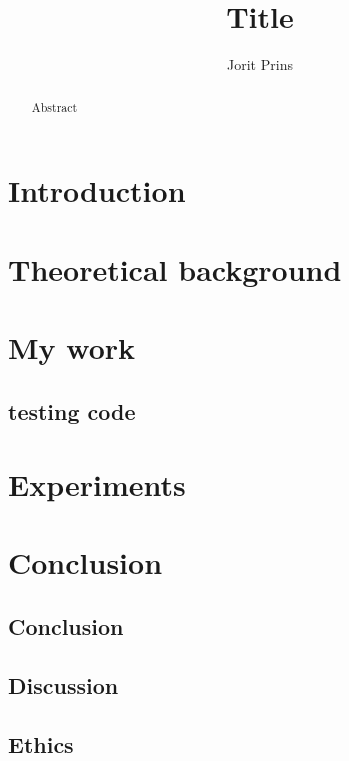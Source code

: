 \documentclass[twoside]{Style/uva-inf-bachelor-thesis}
\title{Title}
\author{Jorit Prins}
\begin{document}
\maketitle

\begin{abstract}
Abstract
\end{abstract}

\tableofcontents

\chapter{Introduction}


\chapter{Theoretical background}


\chapter{My work}
\section{testing code}

\chapter{Experiments}




\chapter{Conclusion}
\section{Conclusion}
\section{Discussion}
\section{Ethics}


\printbibliography
\end{document}
